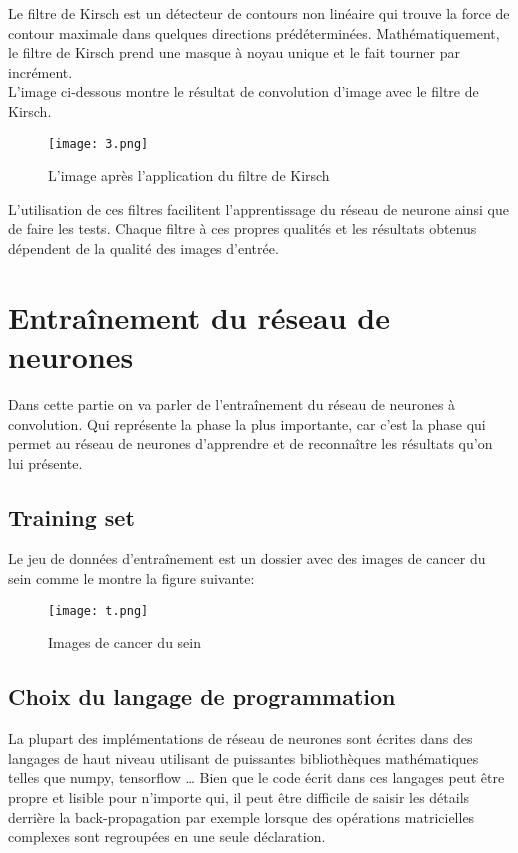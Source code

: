 \documentclass[a4paper,11pt]{report}
\theoremstyle{definition}
\begin{document}
\begin{itemize}
	    Le filtre de Kirsch est un détecteur de contours non linéaire qui trouve la force de contour maximale dans quelques directions prédéterminées. Mathématiquement, le filtre de Kirsch prend une masque à noyau unique et le fait tourner par incrément.\\
	    
	     L’image ci-dessous montre le résultat de convolution d’image avec le filtre de Kirsch. 
    \begin{figure}[!htbp]
   \begin{center}
   \texttt{[image: 3.png]}
   \caption{L'image après l'application du filtre de Kirsch \cite{ref11}  }
   \end{center}
   \end{figure}
	    
\end{itemize}

L’utilisation de ces filtres facilitent l’apprentissage du réseau de neurone ainsi que de faire les tests. Chaque filtre à ces propres qualités et les résultats obtenus dépendent de la qualité des images d’entrée.

\section{Entraînement du réseau de neurones}
Dans cette partie on va parler de l'entraînement du réseau de neurones à convolution. Qui représente la phase la plus importante, car c'est la phase qui permet au réseau de neurones d’apprendre et de reconnaître les résultats qu’on lui présente.


\subsection{Training set}
Le jeu de données d’entraînement est un dossier avec des images de cancer du sein comme le montre la figure suivante:

 \begin{figure}[!htbp]
   \begin{center}
   \texttt{[image: t.png]}
   \caption{Images de cancer du sein \cite{ref11}  }
   \end{center}
   \end{figure}


\subsection{Choix du langage de programmation}
La plupart des implémentations de réseau de neurones sont écrites dans des langages de haut niveau utilisant de puissantes bibliothèques mathématiques telles que numpy, tensorflow … Bien que le code écrit dans ces langages peut être propre et lisible pour n’importe qui, il peut être difficile de saisir les détails derrière la back-propagation par exemple lorsque des opérations matricielles complexes sont regroupées en une seule déclaration.\\
\end{document}
